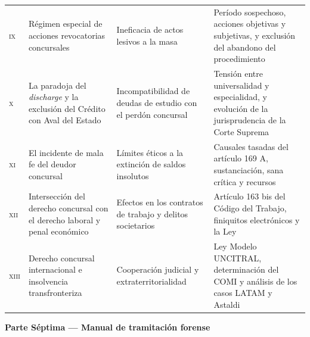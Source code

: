{\begin{longtable}{@{}p{}p{}p{}p{}@{}}
\addlinespace
\textsc{ix} & Régimen especial de acciones revocatorias concursales
& Ineficacia de actos lesivos a la masa
& Período sospechoso, acciones objetivas y subjetivas, y exclusión del abandono del procedimiento \\
\addlinespace
\textsc{x} & La paradoja del \emph{discharge} y la exclusión del Crédito con Aval del Estado
& Incompatibilidad de deudas de estudio con el perdón concursal
& Tensión entre universalidad y especialidad, y evolución de la jurisprudencia de la Corte Suprema \\
\addlinespace
\textsc{xi} & El incidente de mala fe del deudor concursal
& Límites éticos a la extinción de saldos insolutos
& Causales tasadas del artículo 169 A, sustanciación, sana crítica y recursos \\
\addlinespace
\textsc{xii} & Intersección del derecho concursal con el derecho laboral y penal económico
& Efectos en los contratos de trabajo y delitos societarios
& Artículo 163 bis del Código del Trabajo, finiquitos electrónicos y la Ley \Nro 21.595 \\
\addlinespace
\textsc{xiii} & Derecho concursal internacional e insolvencia transfronteriza
& Cooperación judicial y extraterritorialidad
& Ley Modelo UNCITRAL, determinación del COMI y análisis de los casos LATAM y Astaldi \\
\end{longtable}}

\vspace{0.8cm}
\noindent\textbf{\sffamily Parte Séptima — Manual de tramitación forense}

